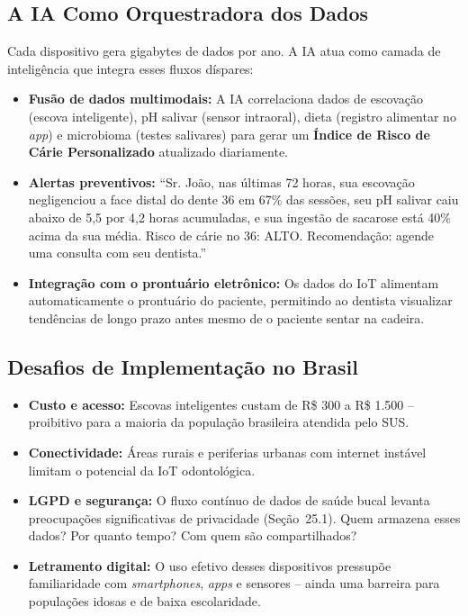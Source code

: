 \subsection{A IA Como Orquestradora dos Dados}

Cada dispositivo gera gigabytes de dados por ano. A IA atua como camada de
inteligência que integra esses fluxos díspares:

\begin{itemize}
  \item \textbf{Fusão de dados multimodais:} A IA correlaciona dados de
    escovação (escova inteligente), pH salivar (sensor intraoral), dieta
    (registro alimentar no \textit{app}) e microbioma (testes salivares) para
    gerar um \textbf{Índice de Risco de Cárie Personalizado} atualizado
    diariamente.

  \item \textbf{Alertas preventivos:} ``Sr. João, nas últimas 72 horas, sua
    escovação negligenciou a face distal do dente 36 em 67\% das sessões,
    seu pH salivar caiu abaixo de 5,5 por 4,2 horas acumuladas, e sua ingestão
    de sacarose está 40\% acima da sua média. Risco de cárie no 36: ALTO.
    Recomendação: agende uma consulta com seu dentista.''

  \item \textbf{Integração com o prontuário eletrônico:} Os dados do IoT
    alimentam automaticamente o prontuário do paciente, permitindo ao dentista
    visualizar tendências de longo prazo antes mesmo de o paciente sentar na
    cadeira.
\end{itemize}

\subsection{Desafios de Implementação no Brasil}

\begin{itemize}
  \item \textbf{Custo e acesso:} Escovas inteligentes custam de R\$ 300 a
    R\$ 1.500 -- proibitivo para a maioria da população brasileira atendida
    pelo SUS.

  \item \textbf{Conectividade:} Áreas rurais e periferias urbanas com internet
    instável limitam o potencial da IoT odontológica.

  \item \textbf{LGPD e segurança:} O fluxo contínuo de dados de saúde bucal
    levanta preocupações significativas de privacidade (Seção~25.1). Quem
    armazena esses dados? Por quanto tempo? Com quem são compartilhados?

  \item \textbf{Letramento digital:} O uso efetivo desses dispositivos pressupõe
    familiaridade com \textit{smartphones}, \textit{apps} e sensores -- ainda
    uma barreira para populações idosas e de baixa escolaridade.
\end{itemize}

